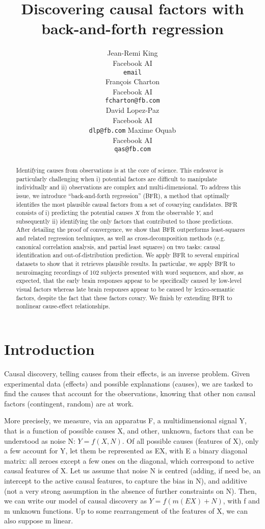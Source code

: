 \documentclass{article}
\title{Discovering causal factors with back-and-forth regression}
\author{%
  Jean-Remi King\\
  Facebook AI\\
  \texttt{email} \\
  \And
  Fran\c{c}ois Charton\\
  Facebook AI\\
  \texttt{fcharton@fb.com}\\
  \And
  David Lopez-Paz\\
  Facebook AI\\
  \texttt{dlp@fb.com}
  \And
  Maxime Oquab\\
  Facebook AI\\
  \texttt{qas@fb.com}
}
\begin{document}
\maketitle

\begin{abstract}
Identifying causes from observations is at the core of science. This endeavor
is particularly challenging when i) potential factors are difficult to
manipulate individually and ii) observations are complex and multi-dimensional.
To address this issue, we introduce ``back-and-forth regression'' (BFR), a
method that optimally identifies the most plausible causal factors from a set
of covarying candidates. BFR consists of i) predicting the potential causes $X$
from the observable $Y$, and subsequently ii) identifying the only factors that
contributed to those predictions. After detailing the proof of convergence, we
show that BFR outperforms least-squares and related regression techniques, as
well as cross-decomposition methods (e.g. canonical correlation analysis, and
partial least squares) on two tasks: causal identification and out-of-distribution
prediction. We apply BFR to several empirical datasets to show that it
retrieves plausible results. In particular, we apply BFR to neuroimaging
recordings of 102 subjects presented with word sequences, and show, as
expected, that the early brain responses appear to be specifically caused by
low-level visual factors whereas late brain responses appear to be caused by
lexico-semantic factors, despite the fact that these factors covary. We finish
by extending BFR to nonlinear cause-effect relationships.
\end{abstract}

\section{Introduction}


Causal discovery, telling causes from their effects, is an inverse problem.
%
Given experimental data (effects) and possible explanations (causes), we are tasked to find the causes that account for the observations, knowing that other non causal factors (contingent, random) are at work.

More precisely, we measure, via an apparatus F, a multidimensional signal Y, that is a function of possible causes X, and other, unknown, factors that can be understood as noise N: $Y=f(X,N)$.
%
Of all possible causes (features of X), only a few account for Y, let them be represented as EX, with E a binary diagonal matrix: all zeroes except a few ones on the diagonal, which correspond to active causal features of X.
%
Let us assume that noise N is centred (adding, if need be, an intercept to the active causal features, to capture the bias in N), and additive (not a very strong assumption in the absence of further constraints on N).
%
Then, we can write our model of causal discovery as $Y=f(m(EX)+N)$, with f and m unknown functions.
%
Up to some rearrangement of the features of X, we can also suppose m linear.
\end{document}
